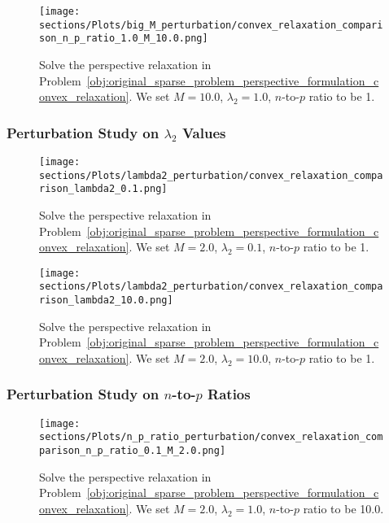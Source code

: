 \begin{figure*}[!ht]
    \centering
    \texttt{[image: sections/Plots/big\_M\_perturbation/convex\_relaxation\_comparison\_n\_p\_ratio\_1.0\_M\_10.0.png]}
    \caption{Solve the perspective relaxation in Problem~\eqref{obj:original_sparse_problem_perspective_formulation_convex_relaxation}.
    We set $M=10.0$, $\lambda_2=1.0$, $n$-to-$p$ ratio to be 1.}
    \label{fig:solve_convex_relaxation_M_10.0_lambda2_1.0_n_p_ratio_1.0}
\end{figure*}

\newpage

\subsubsection{Perturbation Study on $\lambda_2$ Values}


\begin{figure*}[!ht]
    \centering
    \texttt{[image: sections/Plots/lambda2\_perturbation/convex\_relaxation\_comparison\_lambda2\_0.1.png]}
    \caption{Solve the perspective relaxation in Problem~\eqref{obj:original_sparse_problem_perspective_formulation_convex_relaxation}.
    We set $M=2.0$, $\lambda_2=0.1$, $n$-to-$p$ ratio to be 1.}
    \label{fig:solve_convex_relaxation_M_2.0_lambda2_0.1_n_p_ratio_1.0}
\end{figure*}

\begin{figure*}[!ht]
    \centering
    \texttt{[image: sections/Plots/lambda2\_perturbation/convex\_relaxation\_comparison\_lambda2\_10.0.png]}
    \caption{Solve the perspective relaxation in Problem~\eqref{obj:original_sparse_problem_perspective_formulation_convex_relaxation}.
    We set $M=2.0$, $\lambda_2=10.0$, $n$-to-$p$ ratio to be 1.}
    \label{fig:solve_convex_relaxation_M_2.0_lambda2_10.0_n_p_ratio_1.0}
\end{figure*}

\newpage

\subsubsection{Perturbation Study on $n$-to-$p$ Ratios}


\begin{figure*}[!ht]
    \centering
    \texttt{[image: sections/Plots/n\_p\_ratio\_perturbation/convex\_relaxation\_comparison\_n\_p\_ratio\_0.1\_M\_2.0.png]}
    \caption{Solve the perspective relaxation in Problem~\eqref{obj:original_sparse_problem_perspective_formulation_convex_relaxation}.
    We set $M=2.0$, $\lambda_2=1.0$, $n$-to-$p$ ratio to be 10.0.}
    \label{fig:solve_convex_relaxation_M_2.0_lambda2_1.0_n_p_ratio_10.0}
\end{figure*}


